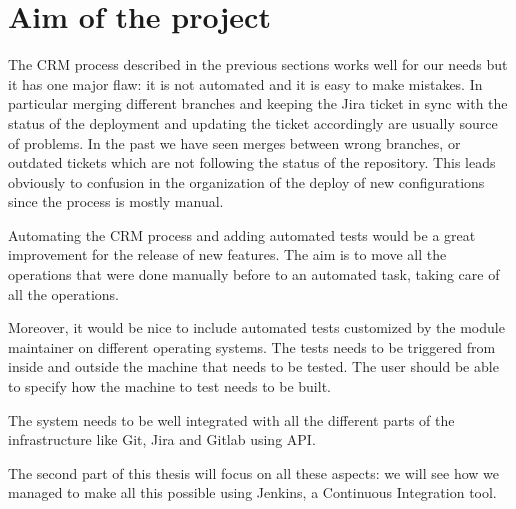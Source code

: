 \section{Aim of the project}

The CRM process described in the previous sections works well for our
needs but it has one major flaw: it is not automated and it is easy to
make mistakes. In particular merging different branches and keeping the
Jira ticket in sync with the status of the deployment and updating the
ticket accordingly are usually source of problems. In the past we have
seen merges between wrong branches, or outdated tickets which are not
following the status of the repository. This leads obviously to confusion
in the organization of the deploy of new configurations since the process
is mostly manual.

Automating the CRM process and adding automated tests would be a great
improvement for the release of new features. The aim is to move all the
operations that were done manually before to an automated task, taking
care of all the operations.

Moreover, it would be nice to include automated tests customized by the
module maintainer on different operating systems. The tests needs to be
triggered from inside and outside the machine that needs to be tested. The
user should be able to specify how the machine to test needs to be built.

The system needs to be well integrated with all the different parts of the
infrastructure like Git, Jira and Gitlab using API.

The second part of this thesis will focus on all these aspects: we will
see how we managed to make all this possible using Jenkins, a Continuous
Integration tool.
